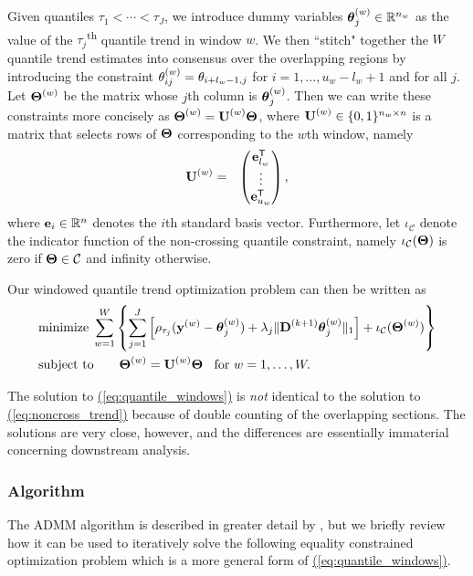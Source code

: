 \documentclass[aoas]{imsart}
\newcommand{\Eqn}[1]{\hyperref[eq:#1]{{\rm (\ref*{eq:#1})}}} %
\newcommand{\Eqn}[1]{{(\ref{eq:#1})}} %
\newcommand{\Real}{\mathbb{R}}
\newcommand{\Tra}{^{\sf T}} %
\newcommand{\V}[1]{{\bm{\mathbf{\MakeLowercase{#1}}}}} %
\newcommand{\VE}[2]{\MakeLowercase{#1}_{#2}} %
\newcommand{\Vn}[2]{\V{#1}^{(#2)}} %
\newcommand{\VnE}[3]{{#1}^{(#2)}_{#3}} %
\newcommand{\M}[1]{{\bm{\mathbf{\MakeUppercase{#1}}}}} %
\newcommand{\Mn}[2]{\M{#1}^{(#2)}} %
\begin{document}
 Given quantiles $\tau_1 < \cdots < \tau_J$, we introduce dummy variables $\Vn{\theta}{w}_{j} \in \Real^{n_w}$ as the value of the $\tau_j$\textsuperscript{th} quantile trend in window $w$. We then ``stitch" together the $W$ quantile trend estimates into consensus over the overlapping regions by introducing the constraint $\VnE{\theta}{w}{ij} = \VE{\theta}{i + l_w - 1,j}$ for $i = 1, \ldots, u_w - l_w + 1$ and for all $j$. Let $\Mn{\Theta}{w}$ be the matrix whose $j$th column is $\Vn{\theta}{w}_{j}$. Then we can write these constraints more concisely as $\Mn{\Theta}{w} = \Mn{U}{w}\M{\Theta}$, where $\Mn{U}{w} \in \{0, 1\}^{n_w \times n}$ is a matrix that selects rows of $\M{\Theta}$ corresponding to the $w$th window, namely
 \begin{eqnarray*}
 	\Mn{U}{w} & = & \begin{pmatrix}
 		\V{e}_{l_w}\Tra \\
 		\vdots \\
 		\V{e}_{u_w}\Tra
 	\end{pmatrix},
 \end{eqnarray*}
 where $\V{e}_i \in \Real^{n}$ denotes the $i$th standard basis vector. Furthermore, let $\iota_{\mathcal{C}}$ denote the indicator function of the non-crossing quantile constraint, namely $\iota_{\mathcal{C}}(\M{\Theta})$ is zero if $\M{\Theta} \in \mathcal{C}$ and infinity otherwise.
 
 Our windowed quantile trend optimization problem can then be written as
 \begin{equation}
 \label{eq:quantile_windows}
 \begin{split}
 &\text{minimize}\; \sum_{w=1}^W \left \{\sum_{j=1}^J \left [\rho_{\tau_j}(\Vn{y}{w} - \Vn{\theta}{w}_{j}) +
 \lambda_j \lVert \Mn{D}{k+1} \Vn{\theta}{w}_{j} \rVert_1 \right ] + \iota_\mathcal{C}(\Mn{\Theta}{w}) \right\}\\
 &\text{subject to} \qquad \Mn{\Theta}{w} = \Mn{U}{w}\M{\Theta} \;\; \text{ for } w = 1, \ldots, W.
 \end{split}
 \end{equation}
  
 The solution to \Eqn{quantile_windows} is {\em not} identical to the solution to \Eqn{noncross_trend} because of double counting of the overlapping sections. The solutions are very close, however, and the differences are essentially immaterial concerning downstream analysis. 
 
\subsubsection{Algorithm}
The ADMM algorithm \citep{gabay1975dual, glowinski1975approximation} is  described in greater detail by \cite{boyd2011distributed}, but we briefly review how it can be used to iteratively solve the following equality constrained optimization problem which is a more general form of \Eqn{quantile_windows}.
\end{document}
